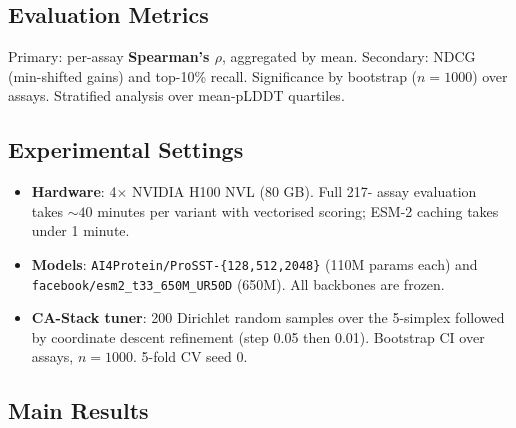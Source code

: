 \documentclass[11pt,a4paper]{article}
\begin{document}
\subsection{Evaluation Metrics}
Primary: per-assay \textbf{Spearman's $\rho$}, aggregated by mean.
Secondary: NDCG (min-shifted gains) and top-10\% recall. Significance
by bootstrap ($n{=}1000$) over assays. Stratified analysis over
mean-pLDDT quartiles.

\subsection{Experimental Settings}
\begin{itemize}[leftmargin=*,itemsep=0pt]
\item \textbf{Hardware}: 4$\times$ NVIDIA H100 NVL (80 GB). Full 217-
assay evaluation takes $\sim\!40$ minutes per variant with vectorised
scoring; ESM-2 caching takes under 1 minute.
\item \textbf{Models}: \texttt{AI4Protein/ProSST-\{128,512,2048\}}
(110M params each) and \texttt{facebook/esm2\_t33\_650M\_UR50D} (650M).
All backbones are frozen.
\item \textbf{CA-Stack tuner}: 200 Dirichlet random samples over the
5-simplex followed by coordinate descent refinement (step 0.05 then
0.01). Bootstrap CI over assays, $n{=}1000$. 5-fold CV seed 0.
\end{itemize}

\subsection{Main Results}
\end{document}
